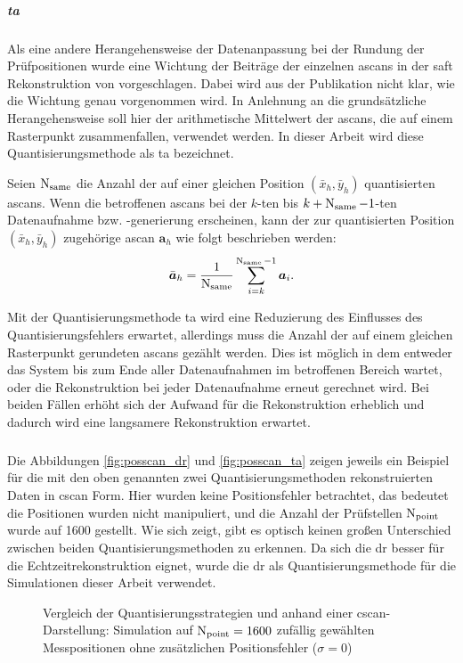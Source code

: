 \subparagraph*{\gls{ta}}
Als eine andere Herangehensweise der Datenanpassung bei der Rundung der Prüfpositionen wurde eine Wichtung der Beiträge der einzelnen \glspl{ascan} in der \acrshort{saft} Rekonstruktion von \cite{Mayer16SAFTwithSmallData} vorgeschlagen. Dabei wird aus der Publikation nicht klar, wie die Wichtung genau vorgenommen wird. In Anlehnung an die grundsätzliche Herangehensweise soll hier der arithmetische Mittelwert der \glspl{ascan}, die auf einem Rasterpunkt zusammenfallen, verwendet werden. In dieser Arbeit wird diese Quantisierungsmethode als \gls{ta} bezeichnet.\par
Seien $\operatorname{N}_{\operatorname{same}}$ die Anzahl der auf einer gleichen Position $(\bar{x}_h, \bar{y}_h)$ quantisierten \glspl{ascan}. Wenn die betroffenen \glspl{ascan} bei der $k$-ten bis $k + \operatorname{N}_{\operatorname{same}} - 1$-ten Datenaufnahme bzw. -generierung erscheinen, kann der zur quantisierten Position $(\bar{x}_h, \bar{y}_h)$ zugehörige \gls{ascan} $\bm{a}_h$ wie folgt beschrieben werden:
\begin{equation}
\bar{\bm{a}}_h = \frac{1}{\operatorname{N}_{\operatorname{same}}} \sum_{i = k}^{\operatorname{N}_{\operatorname{same}} - 1} \bm{a}_i .
\end{equation}

Mit der Quantisierungsmethode \gls{ta} wird eine Reduzierung des Einflusses des Quantisierungsfehlers erwartet, allerdings muss die Anzahl der auf einem gleichen Rasterpunkt gerundeten \glspl{ascan} gezählt werden. Dies ist möglich in dem entweder das System bis zum Ende aller Datenaufnahmen im betroffenen Bereich wartet, oder die Rekonstruktion bei jeder Datenaufnahme erneut gerechnet wird. Bei beiden Fällen erhöht sich der Aufwand für die Rekonstruktion erheblich und dadurch wird eine langsamere Rekonstruktion erwartet. \par

\subparagraph*{}
Die Abbildungen \ref{fig:posscan_dr} und \ref{fig:posscan_ta} zeigen jeweils ein Beispiel für die mit den oben genannten zwei Quantisierungsmethoden rekonstruierten Daten in \gls{cscan} Form. Hier wurden keine Positionsfehler betrachtet, das bedeutet die Positionen wurden nicht manipuliert, und die Anzahl der Prüfstellen $\operatorname{N}_{\operatorname{point}}$ wurde auf 1600 gestellt. Wie sich zeigt, gibt es optisch keinen großen Unterschied zwischen beiden Quantisierungsmethoden zu erkennen. Da sich die \gls{dr} besser für die Echtzeitrekonstruktion eignet, wurde die \gls{dr} als Quantisierungsmethode für die Simulationen dieser Arbeit verwendet. \par
\begin{figure}[h!]
\begin{center}

\caption[C-Scan Darstellung mit 2 Quantisierungsmethoden]{Vergleich der Quantisierungsstrategien  und  anhand einer \gls{cscan}-Darstellung: Simulation auf $\operatorname{N}_{\operatorname{point}} = 1600$ zufällig gewählten Messpositionen ohne zusätzlichen Positionsfehler ($\sigma = 0$)
}
\label{fig:posscan_dr_vs_ta}
\end{center}
\end{figure}

